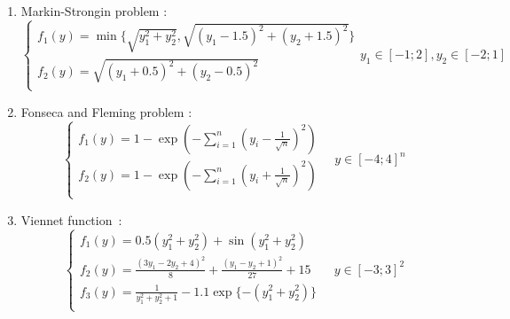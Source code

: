 \documentclass{llncs}
\begin{document}
\begin{enumerate}
  \item Markin-Strongin problem \cite{markinStrongin1993}:
    \begin{equation}
      \left \{
      \begin{array}{l}
        f_1(y) = \min\{\sqrt{y_1^2+y_2^2},\sqrt{(y_1-1.5)^2+(y_2+1.5)^2}\} \\
        f_2(y)=\sqrt{(y_1+0.5)^2+(y_2-0.5)^2} \\
      \end{array}
      \right .
      y_1\in [-1;2],y_2\in [-2;1]
    \end{equation}
  \item Fonseca and Fleming problem \cite{Huband2006}:
  \begin{equation}
    \label{eq:fonseca}
    \left \{
    \begin{array}{l}
      f_{1}\left(y\right) = 1 - \exp \left(-\sum_{i=1}^{n} \left(y_{i} - \frac{1}{\sqrt{n}}
\right)^{2} \right) \\
      f_{2}\left(y\right) = 1 - \exp \left(-\sum_{i=1}^{n} \left(y_{i} + \frac{1}{\sqrt{n}}
\right)^{2} \right) \\
    \end{array}
    \right .
    \quad y\in [-4;4]^n
  \end{equation}
  \item
  Viennet function~\cite{Huband2006}:
  \begin{equation}
    \left \{
    \begin{array}{l}
      f_{1}\left(y\right) = 0.5(y_1^2 + y_2^2) + \sin(y_1^2 + y_2^2)\\
      f_{2}\left(y\right) = \frac{(3y_1 - 2y_2 + 4)^2}{8} + \frac{(y_1-y_2 + 1)^2}{27} + 15\\
      f_{3}\left(y\right) = \frac{1}{y_1^2+y_2^2 + 1} -1.1 \exp\{-(y_1^2+y_2^2)\}\\
    \end{array}
    \right .
    \quad y\in [-3;3]^2
  \end{equation}

\end{enumerate}
\end{document}
